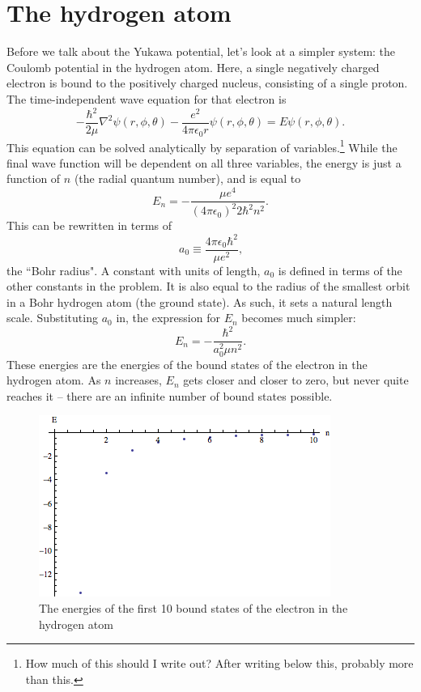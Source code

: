 \documentclass[12pt,twoside]{reedthesis}
\newcommand{\eqn}[1]{\begin{equation}#1\end{equation}}
\begin{document}

\section{The hydrogen atom}

Before we talk about the Yukawa potential, let's look at a simpler system: the Coulomb potential in the hydrogen atom. Here, a single negatively charged electron is bound to the positively charged nucleus, consisting of a single proton. The time-independent wave equation for that electron is
\eqn{
-\frac{\hbar^2}{2\mu}\nabla^2\psi(r,\phi,\theta) - \frac{e^2}{4\pi \epsilon_0 r}\psi (r,\phi,\theta) = E \psi(r,\phi,\theta)\mbox{.}
\label{eq:TIDSWE-hydrogen}
}
This equation can be solved analytically by separation of variables.\footnote{How much of this should I write out? After writing below this, probably more than this.} While the final wave function will be dependent on all three variables, the energy is just a function of $n$ (the radial quantum number), and is equal to
\eqn{
E_n = -\frac{\mu e^4}{(4 \pi \epsilon_0)^2 2 \hbar ^2 n^2}\mbox{.}
\label{eq:hydrogen-E}
}
This can be rewritten in terms of 
\eqn{
a_0 \equiv \frac{4 \pi \epsilon_0 \hbar ^2}{\mu e^2}\mbox{,}
}
the ``Bohr radius". A constant with units of length, $a_0$ is defined in terms of the other constants in the problem. It is also equal to the radius of the smallest orbit in a Bohr hydrogen atom (the ground state). As such, it sets a natural length scale. Substituting $a_0$ in, the expression for $E_n$ becomes much simpler:
\eqn{
E_n = -\frac{\hbar^2}{a_0^2 \mu n^2}\mbox{.}
\label{eq:hydrogen-Ebohr}
}
These energies are the energies of the bound states of the electron in the hydrogen atom. As $n$ increases, $E_n$ gets closer and closer to zero, but never quite reaches it -- there are an infinite number of bound states possible.
\begin{figure}
\includegraphics[scale=0.75]{hydrogenspectrum.png}
\caption{The energies of the first 10 bound states of the electron in the hydrogen atom}
\label{fig:hspec}
\end{figure}
\end{document}
